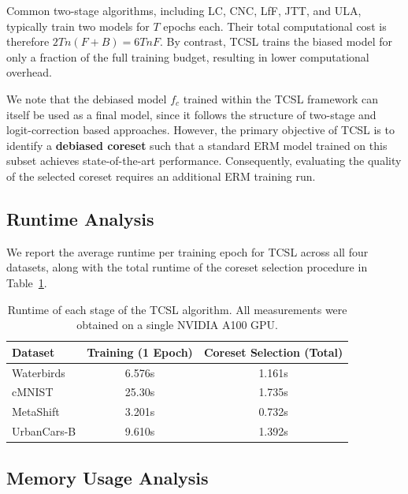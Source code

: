 \documentclass[letter,11pt]{article}
\begin{document}
Common two-stage algorithms, including LC, CNC, LfF, JTT, and ULA, typically train two models for $T$ epochs each. Their total computational cost is therefore $2Tn(F+B)=6TnF$. By contrast, TCSL trains the biased model for only a fraction of the full training budget, resulting in lower computational overhead.

We note that the debiased model $f_c$ trained within the TCSL framework can itself be used as a final model, since it follows the structure of two-stage and logit-correction based approaches. However, the primary objective of TCSL is to identify a \textbf{debiased coreset} such that a standard ERM model trained on this subset achieves state-of-the-art performance. Consequently, evaluating the quality of the selected coreset requires an additional ERM training run.

\subsection{Runtime Analysis}

We report the average runtime per training epoch for TCSL across all four datasets, along with the total runtime of the coreset selection procedure in Table~\ref{tab:tab_runtime}.

\begin{table}[t]
\centering
\begin{tabular}{lcc}
\toprule
\textbf{Dataset} & \textbf{Training (1 Epoch)} & \textbf{Coreset Selection (Total)} \\
\midrule
Waterbirds  & 6.576s & 1.161s \\
cMNIST      & 25.30s & 1.735s \\
MetaShift   & 3.201s & 0.732s \\
UrbanCars-B & 9.610s & 1.392s \\
\bottomrule
\end{tabular}
\caption{Runtime of each stage of the TCSL algorithm. All measurements were obtained on a single NVIDIA A100 GPU.}\label{tab:tab_runtime}
\end{table}

\subsection{Memory Usage Analysis}
\end{document}
